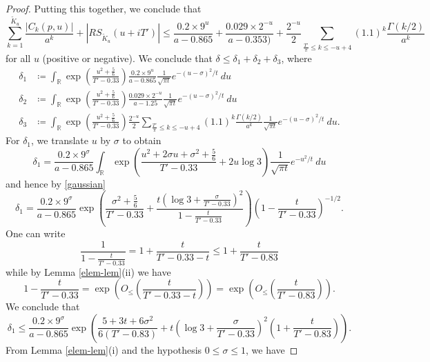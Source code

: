 \documentclass[a4paper,11pt,twoside]{amsart}
\newcommand\R{\mathbb{R}}
\begin{document}
\begin{proof}
Putting this together, we conclude that
$$
\sum_{k=1}^{\tilde K_u} \frac{|C_k(p,u)|}{a^k} + |RS_{\tilde K_u}(u + iT')| \leq 
\frac{0.2 \times 9^u}{a-0.865} + \frac{0.029 \times 2^{-u}}{a - 0.353)} + \frac{2^{-u}}{2} \sum_{\frac{T'}{\pi} \leq k \leq -u+4} (1.1)^{k} \frac{\Gamma(k/2)}{a^k}$$
for all $u$ (positive or negative).  We conclude that $\delta \leq \delta_1 + \delta_2 + \delta_3$, where
\begin{align}
\delta_1 &\coloneqq \int_\R \exp\left( \frac{u^2 + \frac{5}{6}}{T'-0.33} \right) \frac{0.2 \times 9^u}{a-0.865} \frac{1}{\sqrt{\pi t}} e^{-(u-\sigma)^2/t}\ du \nonumber\\
\delta_2 &\coloneqq \int_\R \exp\left( \frac{u^2 + \frac{5}{6}}{T'-0.33} \right) \frac{0.029 \times 2^{-u}}{a - 1.25} \frac{1}{\sqrt{\pi t}} e^{-(u-\sigma)^2/t}\ du \nonumber\\
\delta_3 &\coloneqq \int_\R \exp\left( \frac{u^2 + \frac{5}{6}}{T'-0.33} \right) \frac{2^{-u}}{2} \sum_{\frac{T'}{\pi} \leq k \leq -u+4} (1.1)^{k} \frac{\Gamma(k/2)}{a^k} \frac{1}{\sqrt{\pi t}} e^{-(u-\sigma)^2/t}\ du.\label{delta3-def}
\end{align}
For $\delta_1$, we translate $u$ by $\sigma$ to obtain
$$ \delta_1 = \frac{0.2 \times 9^\sigma}{a-0.865} \int_\R \exp\left( \frac{u^2 + 2 \sigma u + \sigma^2 + \frac{5}{6}}{T'-0.33}  + 2 u \log 3 \right) \frac{1}{\sqrt{\pi t}} e^{-u^2/t}\ du$$
and hence by \eqref{gaussian}
\begin{equation}\label{delta1}
 \delta_1 = \frac{0.2 \times 9^\sigma}{a-0.865} \exp\left( \frac{\sigma^2 + \frac{5}{6}}{T'-0.33} + \frac{t(\log 3 + \frac{\sigma}{T'-0.33})^2}{1 - \frac{t}{T'-0.33}} \right) \left(1 - \frac{t}{T'-0.33}\right)^{-1/2}.
\end{equation}
One can write
\begin{equation}\label{hit}
 \frac{1}{1 - \frac{t}{T'-0.33}} = 1 + \frac{t}{T'-0.33-t} \leq 1 + \frac{t}{T'-0.83}
\end{equation}
while by Lemma \ref{elem-lem}(ii) we have
\begin{equation}\label{hit2}
 1 - \frac{t}{T'-0.33} = \exp\left( O_{\leq}\left( \frac{t}{T'-0.33-t} \right) \right) = \exp\left( O_{\leq}\left( \frac{t}{T'-0.83} \right) \right).
\end{equation}
We conclude that
$$ \delta_1 \leq \frac{0.2 \times 9^\sigma}{a-0.865} \exp\left( \frac{5+3t+6\sigma^2}{6(T'-0.83)} + t\left(\log 3 + \frac{\sigma}{T'-0.33}\right)^2 \left(1 + \frac{t}{T'-0.83}\right) \right).$$
From Lemma \ref{elem-lem}(i) and the hypothesis $0 \leq \sigma \leq 1$, we have

\end{proof}
\end{document}
